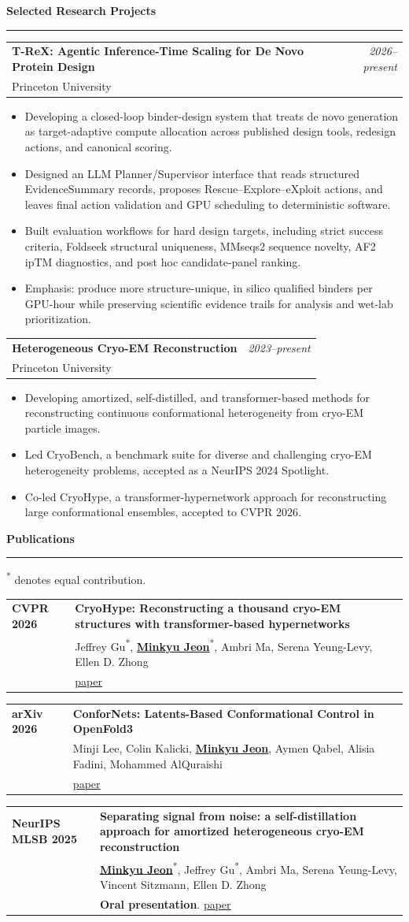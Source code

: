 \documentclass[10pt,letterpaper]{article}
\makeatletter
\newcommand{\minkyu}{\underline{\textbf{Minkyu Jeon}}}
\newcommand{\cofirst}{\textsuperscript{*}}
\newcommand{\cvsection}[1]{%
  \vspace{8pt}
  {\large\bfseries\color{accent} #1}\par
  \vspace{2pt}\hrule\vspace{5pt}
}
\newcommand{\entry}[4]{%
  \begin{tabularx}{\textwidth}{@{}>{\raggedright\arraybackslash}X r@{}}
    \textbf{#1} & \textit{#2}\\
    #3 & #4
  \end{tabularx}\vspace{2pt}
}
\newcommand{\paper}[4]{%
  \begin{tabularx}{\textwidth}{@{}p{2.45cm}>{\raggedright\arraybackslash}X@{}}
    \textbf{#1} & \textbf{#2}\\
    & #3\\
    & {\small #4}
  \end{tabularx}\vspace{4pt}
}
\newcommand{\compactitem}[1]{\begin{itemize}#1\end{itemize}\vspace{1pt}}
\makeatother
\begin{document}
\cvsection{Selected Research Projects}
\entry{T-ReX: Agentic Inference-Time Scaling for De Novo Protein Design}{2026--present}{Princeton University}{}
\compactitem{
  \item Developing a closed-loop binder-design system that treats de novo generation as target-adaptive compute allocation across published design tools, redesign actions, and canonical scoring.
  \item Designed an LLM Planner/Supervisor interface that reads structured EvidenceSummary records, proposes Rescue--Explore--eXploit actions, and leaves final action validation and GPU scheduling to deterministic software.
  \item Built evaluation workflows for hard design targets, including strict success criteria, Foldseek structural uniqueness, MMseqs2 sequence novelty, AF2 ipTM diagnostics, and post hoc candidate-panel ranking.
  \item Emphasis: produce more structure-unique, in silico qualified binders per GPU-hour while preserving scientific evidence trails for analysis and wet-lab prioritization.
}

\entry{Heterogeneous Cryo-EM Reconstruction}{2023--present}{Princeton University}{}
\compactitem{
  \item Developing amortized, self-distilled, and transformer-based methods for reconstructing continuous conformational heterogeneity from cryo-EM particle images.
  \item Led CryoBench, a benchmark suite for diverse and challenging cryo-EM heterogeneity problems, accepted as a NeurIPS 2024 Spotlight.
  \item Co-led CryoHype, a transformer-hypernetwork approach for reconstructing large conformational ensembles, accepted to CVPR 2026.
}

\cvsection{Publications}
\textsuperscript{*} denotes equal contribution.

\vspace{4pt}
\paper{CVPR 2026}{CryoHype: Reconstructing a thousand cryo-EM structures with transformer-based hypernetworks}
{Jeffrey Gu\cofirst, \minkyu\cofirst, Ambri Ma, Serena Yeung-Levy, Ellen D. Zhong}
{\href{https://arxiv.org/pdf/2512.06332}{paper}}

\paper{arXiv 2026}{ConforNets: Latents-Based Conformational Control in OpenFold3}
{Minji Lee, Colin Kalicki, \minkyu, Aymen Qabel, Alisia Fadini, Mohammed AlQuraishi}
{\href{https://arxiv.org/abs/2604.18559}{paper}}

\paper{NeurIPS MLSB 2025}{Separating signal from noise: a self-distillation approach for amortized heterogeneous cryo-EM reconstruction}
{\minkyu\cofirst, Jeffrey Gu\cofirst, Ambri Ma, Serena Yeung-Levy, Vincent Sitzmann, Ellen D. Zhong}
{\textbf{Oral presentation}. \href{https://openreview.net/pdf?id=YIvDrdPCo2}{paper}}
\end{document}
